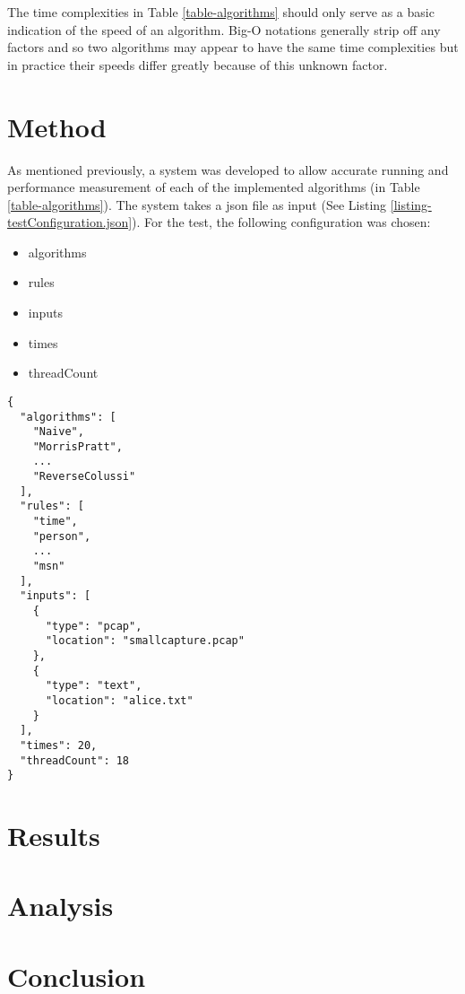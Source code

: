 \documentclass[11pt]{article}
\begin{document}
The time complexities in Table \ref{table-algorithms} should only serve as a basic indication of the speed of an algorithm. Big-O notations generally strip off any factors and so two algorithms may appear to have the same time complexities but in practice their speeds differ greatly because of this unknown factor.

\section{Method}

As mentioned previously, a system was developed to allow accurate running and performance measurement of each of the implemented algorithms (in Table \ref{table-algorithms}). The system takes a json file as input (See Listing \ref{listing-testConfiguration.json}). For the test, the following configuration was chosen:
\begin{itemize}
  \item algorithms
  \item rules
  \item inputs
  \item times
  \item threadCount
\end{itemize}


\begin{lstlisting}[caption = {Sample testConfiguration.json}, label = {listing-testConfiguration.json}]
{
  "algorithms": [
    "Naive",
    "MorrisPratt",
    ...
    "ReverseColussi"
  ],
  "rules": [
    "time",
    "person",
    ...
    "msn"
  ],
  "inputs": [
    {
      "type": "pcap",
      "location": "smallcapture.pcap"
    },
    {
      "type": "text",
      "location": "alice.txt"
    }
  ],
  "times": 20,
  "threadCount": 18
}
\end{lstlisting}

\section{Results}



\section{Analysis}

\section{Conclusion}



\end{document}
